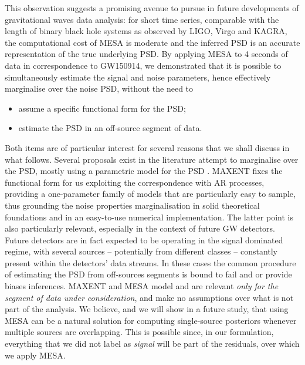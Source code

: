 \documentclass[epj,nopacs]{svjour}
\begin{document}
This observation suggests a promising avenue to pursue in future developments of gravitational waves data analysis: for short time series, comparable with the length of binary black hole systems as observed by LIGO, Virgo and KAGRA, the computational cost of MESA is moderate and the inferred PSD is an accurate representation of the true underlying PSD. By applying MESA to 4 seconds of data in correspondence to GW150914, we demonstrated that it is possible to simultaneously estimate the signal and noise parameters, hence effectively marginalise over the noise PSD, without the need to 
\begin{itemize}
\item assume a specific functional form for the PSD;
\item estimate the PSD in an off-source segment of data.
\end{itemize}
Both items are of particular interest for several reasons that we shall discuss in what follows. Several proposals exist in the literature attempt to marginalise over the PSD, mostly using a parametric model for the PSD \cite{Littenberg_2013,Edwards_2015, lalinference}. MAXENT fixes the functional form for us exploiting the correspondence with AR processes, providing a one-parameter family of models that are particularly easy to sample, thus grounding the noise properties marginalisation in solid theoretical foundations and in an easy-to-use numerical implementation. The latter point is also particularly relevant, especially in the context of future GW detectors. Future detectors are in fact expected to be operating in the signal dominated regime, with several sources -- potentially from different classes -- constantly present within the detectors' data streams. In these cases the common procedure of estimating the PSD from off-sources segments is bound to fail and or provide biases inferences. MAXENT and MESA model and are relevant \emph{only for the segment of data under consideration}, and make no assumptions over what is not part of the analysis. We believe, and we will show in a future study, that using MESA can be a natural solution for computing single-source posteriors whenever multiple sources are overlapping. This is possible since, in our formulation, everything that we did not label as \emph{signal} will be part of the residuals, over which we apply MESA. 
\end{document}
